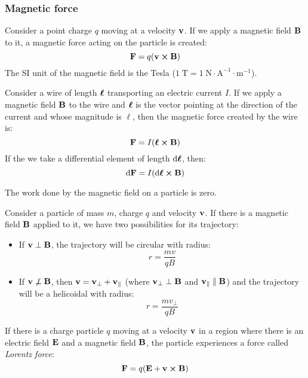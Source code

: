 \documentclass[../../../main.tex]{subfiles}
\begin{document}
\begin{multicols}{2}
  \subsubsection{Magnetic force}
  \begin{proposition}
    Consider a point charge $q$ moving at a velocity $\boldsymbol{\mathrm{v}}$. If we apply a magnetic field $\boldsymbol{\mathrm{B}}$ to it, a magnetic force acting on the particle is created: $$\vf{F}=q(\vf{v}\crossprod\vf{B})$$ The SI unit of the magnetic field is the Tesla ($1\;\text{T}=1\;\text{N}\cdot\text{A}^{-1}\cdot\text{m}^{-1}$).
  \end{proposition}
  \begin{proposition}
    Consider a wire of length $\boldsymbol{\mathrm{\ell}}$ transporting an electric current $I$. If we apply a magnetic field $\boldsymbol{\mathrm{B}}$ to the wire and $\boldsymbol{\mathrm{\ell}}$ is the vector pointing at the direction of the current and whose magnitude is $\ell$, then the magnetic force created by the wire is: $$\vf{F}=I(\vf{\ell}\crossprod\vf{B})$$ If the we take a differential element of length $\dd{\boldsymbol{\mathrm{\ell}}}$, then: $$\dd{\vf{F}}=I(\dd{\vf{\ell}}\crossprod\vf{B})$$
  \end{proposition}
  \begin{lemma}
    The work done by the magnetic field on a particle is zero.
  \end{lemma}
  \begin{proposition}
    Consider a particle of mass $m$, charge $q$ and velocity $\boldsymbol{\mathrm{v}}$. If there is a magnetic field $\boldsymbol{\mathrm{B}}$ applied to it, we have two possibilities for its trajectory:
    \begin{itemize}
      \item If $\boldsymbol{\mathrm{v}}\perp\boldsymbol{\mathrm{B}}$, the trajectory will be circular with radius: $$r=\frac{mv}{qB}$$
      \item If $\boldsymbol{\mathrm{v}}\not\perp\boldsymbol{\mathrm{B}}$, then $\boldsymbol{\mathrm{v}}=\boldsymbol{\mathrm{v}}_\perp+\boldsymbol{\mathrm{v}}_\parallel$ (where $\boldsymbol{\mathrm{v}}_\perp\perp\boldsymbol{\mathrm{B}}$ and $\boldsymbol{\mathrm{v}}_\parallel\parallel\boldsymbol{\mathrm{B}}$) and the trajectory will be a helicoidal with radius: $$r=\frac{mv_\perp}{qB}$$
    \end{itemize}
  \end{proposition}
  \begin{proposition}
    If there is a charge particle $q$ moving at a velocity $\boldsymbol{\mathrm{v}}$ in a region where there is an electric field $\boldsymbol{\mathrm{E}}$ and a magnetic field $\boldsymbol{\mathrm{B}}$, the particle experiences a force called \emph{Lorentz force}: $$\vf{F}=q(\vf{E}+\vf{v}\crossprod\vf{B})$$
  \end{proposition}

\end{multicols}
\end{document}
